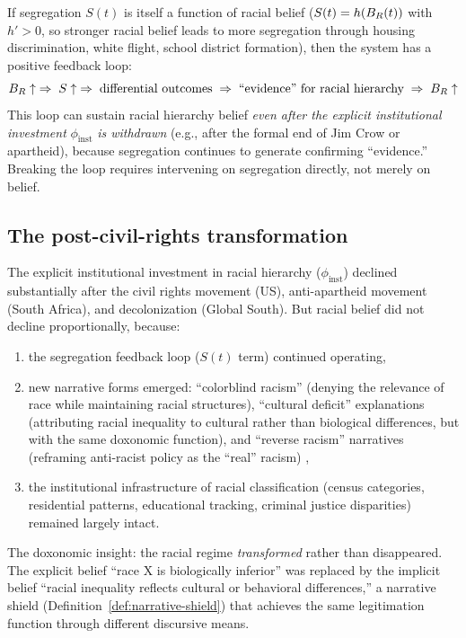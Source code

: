 \begin{proposition}
\label{prop:segregation-feedback}
If segregation $S(t)$ is itself a function of racial belief ($S(t) = h(B_{R}(t))$ with $h' > 0$, so stronger racial belief leads to more segregation through housing discrimination, white flight, school district formation), then the system has a positive feedback loop:
\[
  B_{R} \uparrow \;\Rightarrow\; S \uparrow \;\Rightarrow\; \text{differential outcomes} \;\Rightarrow\; \text{``evidence'' for racial hierarchy} \;\Rightarrow\; B_{R} \uparrow
\]
This loop can sustain racial hierarchy belief \emph{even after the explicit institutional investment} $\phi_{\text{inst}}$ \emph{is withdrawn} (e.g., after the formal end of Jim Crow or apartheid), because segregation continues to generate confirming ``evidence.''
Breaking the loop requires intervening on segregation directly, not merely on belief.
\end{proposition}

\subsection{The post-civil-rights transformation}

The explicit institutional investment in racial hierarchy ($\phi_{\text{inst}}$) declined substantially after the civil rights movement (US), anti-apartheid movement (South Africa), and decolonization (Global South).
But racial belief did not decline proportionally, because:
\begin{enumerate}[nosep]
  \item the segregation feedback loop ($S(t)$ term) continued operating,
  \item new narrative forms emerged: ``colorblind racism'' (denying the relevance of race while maintaining racial structures), ``cultural deficit'' explanations (attributing racial inequality to cultural rather than biological differences, but with the same doxonomic function), and ``reverse racism'' narratives (reframing anti-racist policy as the ``real'' racism) \autocite{bonilla-silva2018},
  \item the institutional infrastructure of racial classification (census categories, residential patterns, educational tracking, criminal justice disparities) remained largely intact.
\end{enumerate}

The doxonomic insight: the racial regime \emph{transformed} rather than disappeared.
The explicit belief ``race X is biologically inferior'' was replaced by the implicit belief ``racial inequality reflects cultural or behavioral differences,'' a narrative shield (Definition~\ref{def:narrative-shield}) that achieves the same legitimation function through different discursive means.

